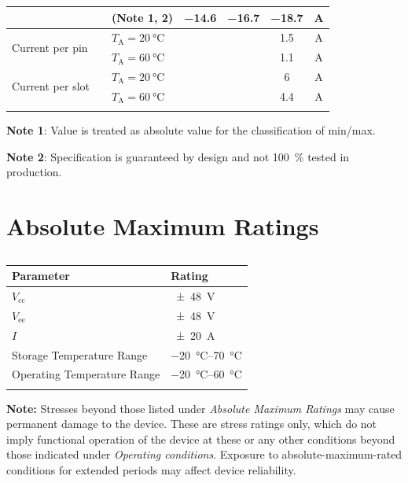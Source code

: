 \documentclass[10pt]{datasheet}
\begin{document}
\begin{table}[h!]
\begin{threeparttable}
\begin{tabularx}{\textwidth}{l | c | X | c c c | c}
             & & (Note 1, 2) & \num{-14.6} & \num{-16.7} & \num{-18.7} & \unit{\A} \\
            \hline
            \multirow{2}{*}{Current per pin} & & $T_\text{A} = \qty{20}{\celsius}$ & & & 1.5 & \unit{\A}\\
            & & $T_\text{A} = \qty{60}{\celsius}$ & & & 1.1 & \unit{\A}\\
            \multirow{2}{*}{Current per slot} & & $T_\text{A} = \qty{20}{\celsius}$ & & & 6 & \unit{\A}\\
            & & $T_\text{A} = \qty{60}{\celsius}$ & & & 4.4 & \unit{\A}\\
            \thickhline
        \end{tabularx}
        \begin{tablenotes}
            \item{\textbf{Note 1}: Value is treated as absolute value for the classification of min/max.}
            \item{\textbf{Note 2}: Specification is guaranteed by design and not \qty{100}{\percent} tested in production.}
        \end{tablenotes}
    \end{threeparttable}
\end{table}

\section{Absolute Maximum Ratings}

\begin{table}[h]
    \caption{}
    \begin{tabularx}{\textwidth}{l | X}
        \thickhline
        \textbf{Parameter} & \textbf{Rating} \hspace{5cm} \\
        \hline
        $V_\text{cc}$ & \qty{\pm 48}{\V} \\
        $V_\text{ee}$ & \qty{\pm 48}{\V} \\
        $I$ & \qty{\pm 20}{\A} \\
        Storage Temperature Range & \qtyrange{-20}{70}{\celsius}\\
        Operating Temperature Range & \qtyrange{-20}{60}{\celsius}\\
        \thickhline
    \end{tabularx}
\end{table}

\textbf{Note:} Stresses beyond those listed under \textit{Absolute Maximum Ratings} may cause permanent damage to the device. These are stress ratings only, which do not imply functional operation of the device at these or any other conditions beyond those indicated under \textit{Operating conditions}. Exposure to absolute-maximum-rated conditions for extended periods may affect device reliability.
\end{document}
